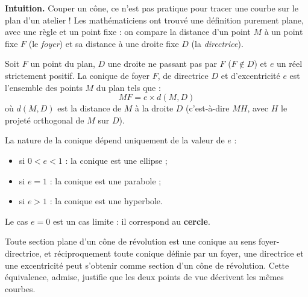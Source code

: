 \documentclass[11pt]{article}
\newcommand{\cle}[1]{{\popxbold\color{popdark}#1}}
\begin{document}
\textbf{Intuition.} Couper un cône, ce n'est pas pratique pour tracer une courbe sur le plan d'un atelier ! Les mathématiciens ont trouvé une définition purement plane, avec une règle et un point fixe : on compare la distance d'un point $M$ à un point fixe $F$ (le \emph{foyer}) et sa distance à une droite fixe $D$ (la \emph{directrice}).

\begin{definition}
Soit $F$ un point du plan, $D$ une droite ne passant pas par $F$ ($F \notin D$) et $e$ un réel strictement positif. La \cle{conique} de \cle{foyer} $F$, de \cle{directrice} $D$ et d'\cle{excentricité} $e$ est l'ensemble des points $M$ du plan tels que :
\[ MF = e \times d(M,D) \]
où $d(M,D)$ est la distance de $M$ à la droite $D$ (c'est-à-dire $MH$, avec $H$ le projeté orthogonal de $M$ sur $D$).
\end{definition}

\begin{propriete}
La nature de la conique dépend uniquement de la valeur de $e$ :
\begin{itemize}
\item si $0 < e < 1$ : la conique est une \cle{ellipse} ;
\item si $e = 1$ : la conique est une \cle{parabole} ;
\item si $e > 1$ : la conique est une \cle{hyperbole}.
\end{itemize}
Le cas $e = 0$ est un cas limite : il correspond au \textbf{cercle}.
\end{propriete}

\begin{propriete}
Toute section plane d'un cône de révolution est une conique au sens foyer-directrice, et réciproquement toute conique définie par un foyer, une directrice et une excentricité peut s'obtenir comme section d'un cône de révolution. Cette équivalence, admise, justifie que les deux points de vue décrivent les mêmes courbes.
\end{propriete}
\end{document}
